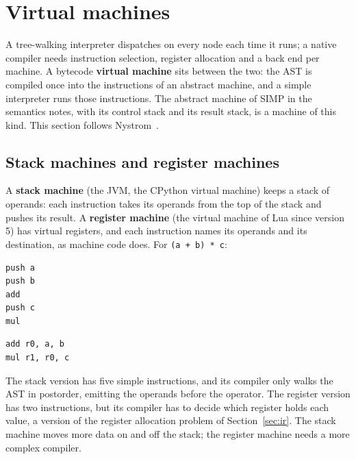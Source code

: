 \section{Virtual machines}
\label{sec:vm}

A tree-walking interpreter dispatches on every node each time it runs; a
native compiler needs instruction selection, register allocation and a back
end per machine. A bytecode \textbf{virtual machine} sits between the two: the
AST is compiled once into the instructions of an abstract machine, and a
simple interpreter runs those instructions. The abstract machine of SIMP in
the semantics notes, with its control stack and its result stack, is a
machine of this kind. This section follows Nystrom~\cite[Part~III]{nystrom2021crafting}.

\subsection{Stack machines and register machines}

A \textbf{stack machine} (the JVM, the CPython virtual machine) keeps a stack of
operands: each instruction takes its operands from the top of the stack and
pushes its result. A \textbf{register machine} (the virtual machine of Lua
since version 5) has virtual registers, and each instruction names its
operands and its destination, as machine code does. For \texttt{(a + b) * c}:
\begin{center}
\begin{minipage}[t]{0.35\textwidth}
\begin{lstlisting}
push a
push b
add
push c
mul
\end{lstlisting}
\end{minipage}
\hspace{1cm}
\begin{minipage}[t]{0.4\textwidth}
\begin{lstlisting}
add r0, a, b
mul r1, r0, c
\end{lstlisting}
\end{minipage}
\end{center}
The stack version has five simple instructions, and its compiler only walks
the AST in postorder, emitting the operands before the operator. The register
version has two instructions, but its compiler has to decide which register
holds each value, a version of the register allocation problem of
Section~\ref{sec:ir}. The stack machine moves more data on and off the stack;
the register machine needs a more complex compiler.

